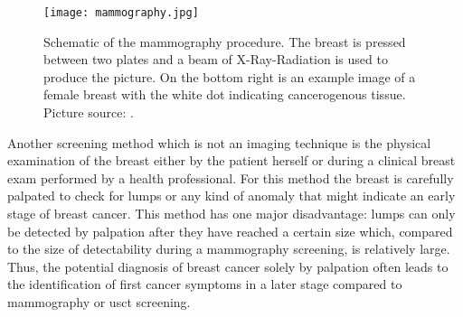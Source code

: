 \begin{figure}[H]
    \centering
    \texttt{[image: mammography.jpg]}
    \caption{Schematic of the mammography procedure. The breast is pressed between two plates and a beam of X-Ray-Radiation is used to produce the picture. On the bottom right is an example image of a female breast with the white dot indicating cancerogenous tissue. Picture source: \cite{NationalInstitutesofHealthNIH-NationalCancerInstituteNCIBreastTreatment}. }
    \label{mammo_example_picture}
\end{figure}

Another screening method which is not an imaging technique is the physical examination of the breast either by the patient herself or during a clinical breast exam performed by a health professional. For this method the breast is carefully palpated to check for lumps or any kind of anomaly that might indicate an early stage of breast cancer. This method has one major disadvantage: lumps can only be detected by palpation after they have reached a certain size which, compared to the size of detectability during a mammography screening, is relatively large. Thus, the potential diagnosis of breast cancer solely by palpation often leads to the identification of first cancer symptoms in a later stage compared to mammography or \ac{usct} screening.

\bigskip

